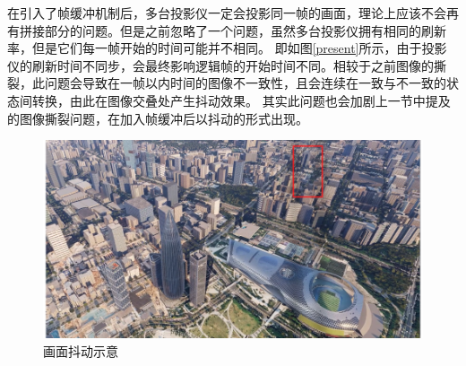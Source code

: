 \par
在引入了帧缓冲机制后，多台投影仪一定会投影同一帧的画面，理论上应该不会再有拼接部分的问题。但是之前忽略了一个问题，虽然多台投影仪拥有相同的刷新率，但是它们每一帧开始的时间可能并不相同。
即如图\ref{present}所示，由于投影仪的刷新时间不同步，会最终影响逻辑帧的开始时间不同。相较于之前图像的撕裂，此问题会导致在一帧以内时间的图像不一致性，且会连续在一致与不一致的状态间转换，由此在图像交叠处产生抖动效果。
其实此问题也会加剧上一节中提及的图像撕裂问题，在加入帧缓冲后以抖动的形式出现。
\begin{figure}[h!]
    \begin{center}
        \includegraphics[width=\textwidth]{pictures/jitter.png}
        \caption{画面抖动示意}
        \label{jitter}
    \end{center}
\end{figure}
